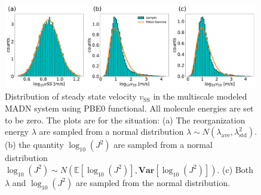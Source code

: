 \documentclass[letterpaper,12pt]{article}
\begin{document}
\begin{figure}[H]
    \centering
    \includegraphics[width=0.99\textwidth]{figs/MADN_HFX/fig_mle_MADN_noE_SS.pdf}
    \caption{Distribution of steady state velocity $v_\text{SS}$ in the multiscale modeled MADN system using PBE0 functional. All molecule energies are set to be zero.  
    The plots are for the situation: (a) The reorganization energy $\lambda$ are sampled from a normal distribution $\lambda \sim N(\lambda_\text{ave},\lambda^2_\text{std})$. (b) the quantity $\log_{10}(J^2)$ are sampled from a normal distribution $\log_{10}(J^2) \sim N(\mathbb{E}[\log_{10}(J^2)], \textbf{Var}[\log_{10}(J^2)] )$. (c) Both $\lambda$ and $\log_{10}(J^2)$ are sampled from the normal distribution. }
    \label{fig:mle_MADN_noE_SS}
\end{figure}



\end{document}
